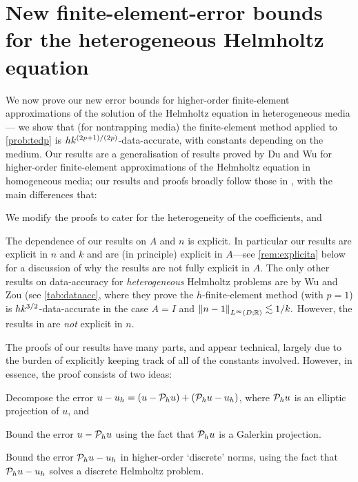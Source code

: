 
\section{New finite-element-error bounds for the heterogeneous Helmholtz equation}\label{sec:fem}

We now prove our new error bounds for higher-order finite-element approximations of the solution of the Helmholtz equation in heterogeneous media--- we show that (for nontrapping media) the finite-element method applied to \cref{prob:tedp} is $hk^{(2p+1)/(2p)}$-data-accurate, with constants depending on the medium. Our results are a generalisation of results proved by Du and Wu \cite{DuWu:15} for higher-order finite-element approximations of the Helmholtz equation in homogeneous media; our results and proofs broadly follow those in \cite{DuWu:15}, with the main differences that:
\ben
\item We modify the proofs to cater for the heterogeneity of the coefficients, and
\item The dependence of our results on $A$ and $n$ is explicit.
\een
  In particular our results are explicit in $n$ and $k$ and are (in principle) explicit in $A$---see \cref{rem:explicita} below for a discussion of why the results are not fully explicit in $A$. The only other results on data-accuracy for \emph{heterogeneous} Helmholtz problems are by Wu and Zou \cite[Lemma 3.3]{WuZo:18} (see \cref{tab:dataacc}, where they prove the $h$-finite-element method (with $p=1$) is $hk^{3/2}$-data-accurate in the case $A=I$ and $\NLiDRR{n-1} \lesssim 1/k.$ However, the results in \cite[Lemma 3.3]{WuZo:18} are \emph{not} explicit in $n.$

The proofs of our results have many parts, and appear technical, largely due to the burden of explicitly keeping track of all of the constants involved. However, in essence, the proof consists of two ideas:
\ben
\item Decompose the error $u-u_{h} = (u - \mathcal P_{h} u) + (\mathcal P_{h} u - u_{h})$, where $\mathcal P_{h} u$ is an elliptic projection of $u$, and
\item Bound the error $u - \mathcal P_{h} u$ using the fact that $\mathcal P_{h} u$ is a Galerkin projection.
\item Bound the error $\mathcal P_{h} u - u_{h}$ in higher-order `discrete' norms, using the fact that $\mathcal P_{h} u - u_{h}$ solves a discrete Helmholtz problem.
\een

